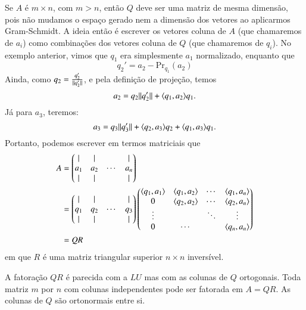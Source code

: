 Se $A$ é $m\times n$, com $m>n$, então $Q$ deve ser uma matriz de mesma dimensão, pois não mudamos o espaço gerado nem a dimensão dos vetores ao aplicarmos Gram-Schmidt. A ideia então é escrever os vetores coluna de $A$ (que chamaremos de $a_i$) como combinações dos vetores coluna de $Q$ (que chamaremos de $q_i$). No exemplo anterior, vimos que $q_1$ era simplesmente $a_1$ normalizado, enquanto que
\begin{equation*}
  q_2' = a_2-\text{Pr}_{q_1}(a_2) 
\end{equation*}
Ainda, como $q_2=\frac{q_2'}{\| q_2' \|}$, e pela definição de projeção, temos
\begin{equation*}
	a_2 = q_2\| q_2' \|+\langle q_1, a_2 \rangle q_1.
\end{equation*}
Já para $a_3$, teremos:
\begin{equation*}
	a_3 = q_3\| q_3' \|+\langle q_2, a_3 \rangle q_2+\langle q_1, a_3 \rangle q_1.
\end{equation*}
Portanto, podemos escrever em termos matriciais que
\begin{align*}
  A &= \begin{pmatrix}
      |   & |   &        & | \\
      a_1 & a_2 & \cdots & a_n\\
      |   & |   &        & |
    \end{pmatrix}\\
	&=
    \begin{pmatrix}
      |   & |   &        & |\\
      q_1 & q_2 & \cdots & q_3\\
      |   & |   &        & |
    \end{pmatrix}
    \begin{pmatrix}
      \langle q_1, a_1 \rangle & \langle q_1, a_2 \rangle & \cdots & \langle q_1, a_n \rangle\\
      0             & \langle q_2, a_2 \rangle & \cdots & \langle q_2, a_n \rangle\\
      \vdots        &               & \ddots &    \vdots    \\
      0             & \cdots        &        & \langle q_n, a_n \rangle
    \end{pmatrix}\\
	&= QR
\end{align*}
em que $R$ é uma matriz triangular superior $n\times n$ inversível.

A fatoração $QR$ é parecida com a $LU$ mas com as colunas de $Q$ ortogonais. Toda matriz $m$ por $n$ com colunas independentes pode ser fatorada em $A=QR$. As colunas de $Q$ são ortonormais entre si.

